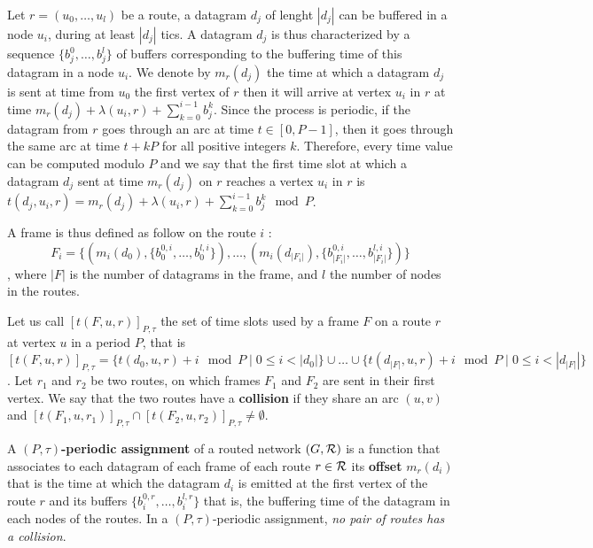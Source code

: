\documentclass[10pt]{article}
\begin{document}
      Let $r=(u_0,\dots,u_l)$ be a route, a datagram $d_j$ of lenght $|d_j|$ can be buffered in a node $u_i$, during at least $|d_j|$ tics. A datagram $d_j$ is thus characterized by a sequence $\{b_j^0,\ldots,b_j^l\}$ of buffers corresponding to the buffering time of this datagram in a node $ u_i$. We denote by $m_r(d_j)$ the time at which a datagram $d_j$ is sent at time from $u_0$ the first vertex of $r$ then it will arrive at vertex $u_i$ in $r$ at time $m_r(d_j) + \lambda(u_i,r) + \sum_{k=0}^{i-1}b_j^k$. Since the process is periodic, if the datagram from $r$ goes through an arc at time $t\in [0,P-1]$,  then it goes through the same arc at time $t+kP$ for all positive integers $k$. Therefore, every time value can be computed modulo $P$ and we say that the first time slot at which a datagram $d_j$ sent at time $m_r(d_j)$ on $r$ reaches a vertex $u_i$ in $r$ is $t(d_j,u_i,r) = m_r(d_j) + \lambda(u_i,r) + \sum_{k=0}^{i-1}b_j^k \mod P$. 
      
      A frame is thus defined as follow on the route $i$ : $$F_i = \{ (m_i(d_0),\{b_0^{0,i},\ldots,b_0^{l,i}\}),\ldots,(m_i(d_{|F_i|}),\{b_{|F_i|}^{0,i},\ldots,b_{|F_i|}^{l,i}\}) \}$$, where $|F|$ is the number of datagrams in the frame, and $l$ the number of nodes in the routes.
      
       Let us call $[t(F,u,r)]_{P,\tau}$ the set of time slots used by a frame $F$ on a route $r$ at vertex $u$ in a period $P$, that is $[t(F,u,r)]_{P,\tau} = \{t(d_0,u,r) + i \mod P \mid 0 \leq i < |d_0|\} \cup \ldots \cup \{ t(d_{|F|},u,r) + i \mod P \mid 0 \leq i < |d_{|F|}|\}  $.
      Let $r_1$ and $r_2$ be two routes, on which frames $F_1$ and $F_2$ are sent in their first vertex.
      We say that the two routes have a {\bf collision} if they share an arc $(u,v)$ and $[t(F_1,u,r_{1})]_{P,\tau} \cap [t(F_2,u,r_{2})]_{P,\tau} \neq \emptyset$.
      
         A {\bf $(P,\tau)$-periodic assignment} of a routed network $(G,\cal R)$ is a function that associates to each datagram of each frame of each route 
         $r \in \cal R$ its \textbf{offset} $m_r(d_i)$ that is the time at which the datagram $d_i$ is emitted at the first vertex of the route $r$ and its buffers $\{b_i^{0,r},\ldots,b_i^{l,r}\}$ that is, the buffering time of the datagram in each nodes of the routes. In a $(P,\tau)$-periodic assignment, \emph{no pair of routes has a collision}.
	 
\end{document}
